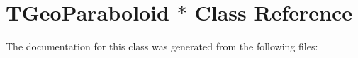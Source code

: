 \hypertarget{class_t_geo_paraboloid_01_5}{}\section{T\+Geo\+Paraboloid $\ast$ Class Reference}
\label{class_t_geo_paraboloid_01_5}


The documentation for this class was generated from the following files\+: